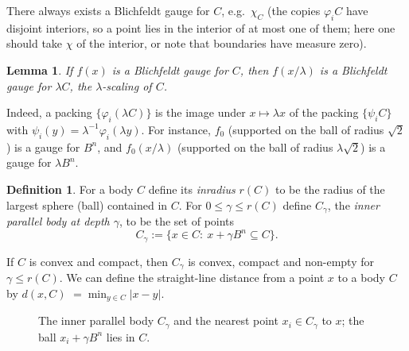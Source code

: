 \documentclass[11pt,openany]{book}
\theoremstyle{plain}
\newtheorem{lemma}[theorem]{Lemma}
\theoremstyle{definition}
\newtheorem{definition}[theorem]{Definition}
\theoremstyle{remark}
\newcommand{\added}[1]{{\color{addcol}#1}}
\newcommand{\orig}[1]{\marginpar{\raggedright\scriptsize\color{gray}#1}}
\newcommand{\abs}[1]{\left\lvert #1 \right\rvert}
\newcommand{\Ball}{B}                  %
\begin{document}
There always exists a Blichfeldt gauge for $C$, e.g.\ $\chi_C$ \added{(the copies $\varphi_iC$ have disjoint interiors, so a point lies in
the interior of at most one of them; here one should take $\chi$ of the interior, or note that boundaries have measure zero)}.

\begin{lemma}\label{L3:lem:scaling}
If $f(x)$ is a Blichfeldt gauge for $C$, then $f(x/\lambda)$ is a Blichfeldt gauge for $\lambda C$, the $\lambda$-scaling of $C$.
\end{lemma}
\added{Indeed, a packing $\{\varphi_i(\lambda C)\}$ is the image under $x\mapsto\lambda x$ of the packing $\{\psi_iC\}$ with
$\psi_i(y)=\lambda^{-1}\varphi_i(\lambda y)$.}
For instance, $f_0$ (supported on the ball of radius $\sqrt2$) is a gauge for $\Ball^n$, and $f_0(x/\lambda)$ (supported on the ball of
radius $\lambda\sqrt2$) is a gauge for $\lambda\Ball^n$.\orig{Diagram of this scaling omitted.}

\begin{definition}\label{L3:def:inradius}
For a body $C$ define its \emph{inradius} $r(C)$ to be the radius of the largest sphere \added{(ball)} contained in $C$.
For $0\le\gamma\le r(C)$ define $C_\gamma$, the \emph{inner parallel body at depth $\gamma$}, to be the set of points
\[
  C_\gamma:=\{x\in C:\ x+\gamma\Ball^n\subseteq C\}.
\]
\end{definition}
\added{If $C$ is convex and compact, then $C_\gamma$ is convex, compact and non-empty for $\gamma\le r(C)$.}
We can define the straight-line distance from a point $x$ to a body $C$ by $d(x,C)$ \added{$=\min_{y\in C}\abs{x-y}$}.

\begin{figure}[ht]
\centering
{}
\caption{The inner parallel body $C_\gamma$ and the nearest point $x_i\in C_\gamma$ to $x$; the ball $x_i+\gamma\Ball^n$ lies in $C$.}
\label{L3:fig:parallel}
\end{figure}
\end{document}
